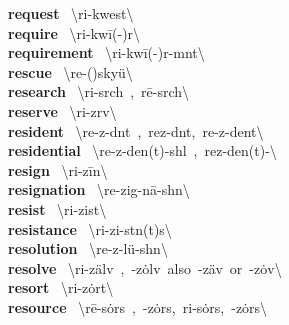 \documentclass[10pt,a4paper]{article}
\begin{document}
\begin{multicols}{2}
\textbf{ request }\quad \ \textbackslash ri-\textprimstress kwest\textbackslash \\
\textbf{ require }\quad \ \textbackslash ri-\textprimstress kw\={i}(-\textschwa )r\textbackslash \\
\textbf{ requirement }\quad \ \textbackslash ri-\textprimstress kw\={i}(-\textschwa )r-m\textschwa nt\textbackslash \\
\textbf{ rescue }\quad \ \textbackslash \textprimstress re-(\textsecstress )sky\"{u}\textbackslash \\
\textbf{ research }\quad \ \textbackslash ri-\textprimstress s\textschwa rch\ ,\ \textprimstress r\={e}-\textsecstress s\textschwa rch\textbackslash \\
\textbf{ reserve }\quad \ \textbackslash ri-\textprimstress z\textschwa rv\textbackslash \\
\textbf{ resident }\quad \ \textbackslash \textprimstress re-z\textschwa -d\textschwa nt\ ,\ \textprimstress rez-d\textschwa nt,\ \textprimstress re-z\textschwa -\textsecstress dent\textbackslash \\
\textbf{ residential }\quad \ \textbackslash \textsecstress re-z\textschwa -\textprimstress den(t)-sh\textschwa l\ ,\ \textsecstress rez-\textprimstress den(t)-\textbackslash \\
\textbf{ resign }\quad \ \textbackslash ri-\textprimstress z\={i}n\textbackslash \\
\textbf{ resignation }\quad \ \textbackslash \textsecstress re-zig-\textprimstress n\={a}-sh\textschwa n\textbackslash \\
\textbf{ resist }\quad \ \textbackslash ri-\textprimstress zist\textbackslash \\
\textbf{ resistance }\quad \ \textbackslash ri-\textprimstress zi-st\textschwa n(t)s\textbackslash \\
\textbf{ resolution }\quad \ \textbackslash \textsecstress re-z\textschwa -\textprimstress l\"{u}-sh\textschwa n\textbackslash \\
\textbf{ resolve }\quad \ \textbackslash ri-\textprimstress z\"{a}lv\ ,\ -\textprimstress z\.{o}lv\ also\ -\textprimstress z\"{a}v\ or\ -\textprimstress z\.{o}v\textbackslash \\
\textbf{ resort }\quad \ \textbackslash ri-\textprimstress z\.{o}rt\textbackslash \\
\textbf{ resource }\quad \ \textbackslash \textprimstress r\={e}-\textsecstress s\.{o}rs\ ,\ -\textsecstress z\.{o}rs,\ ri-\textprimstress s\.{o}rs,\ -\textprimstress z\.{o}rs\textbackslash \\

\end{multicols}
\end{document}
